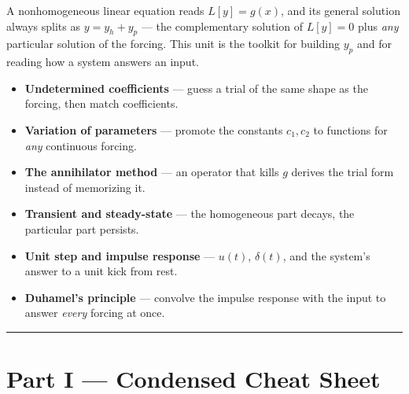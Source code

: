 \begin{topicsbox}
A nonhomogeneous linear equation reads $L[y] = g(x)$, and its general solution
always splits as $y = y_h + y_p$ --- the complementary solution of $L[y]=0$ plus
\emph{any} particular solution of the forcing. This unit is the toolkit for
building $y_p$ and for reading how a system answers an input.
\begin{itemize}[leftmargin=1.4em, itemsep=3pt]
    \item \textbf{Undetermined coefficients} --- guess a trial of the same shape as
          the forcing, then match coefficients.
    \item \textbf{Variation of parameters} --- promote the constants $c_1,c_2$ to
          functions for \emph{any} continuous forcing.
    \item \textbf{The annihilator method} --- an operator that kills $g$ derives
          the trial form instead of memorizing it.
    \item \textbf{Transient and steady-state} --- the homogeneous part decays, the
          particular part persists.
    \item \textbf{Unit step and impulse response} --- $u(t)$, $\delta(t)$, and the
          system's answer to a unit kick from rest.
    \item \textbf{Duhamel's principle} --- convolve the impulse response with the
          input to answer \emph{every} forcing at once.
\end{itemize}
\end{topicsbox}

\vspace{0.6em}
\hrule
\vspace{0.6em}

{}
\section*{Part I --- Condensed Cheat Sheet}
\setcounter{section}{10}   %

